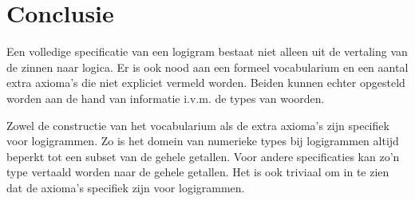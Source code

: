 \section{Conclusie}
Een volledige specificatie van een logigram bestaat niet alleen uit de vertaling van de zinnen naar logica. Er is ook nood aan een formeel vocabularium en een aantal extra axioma's die niet expliciet vermeld worden. Beiden kunnen echter opgesteld worden aan de hand van informatie i.v.m. de types van woorden.

Zowel de constructie van het vocabularium als de extra axioma's zijn specifiek voor logigrammen. Zo is het domein van numerieke types bij logigrammen altijd beperkt tot een subset van de gehele getallen. Voor andere specificaties kan zo'n type vertaald worden naar de gehele getallen. Het is ook triviaal om in te zien dat de axioma's specifiek zijn voor logigrammen.
